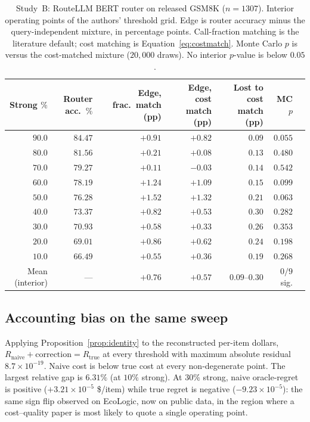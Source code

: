 \documentclass[a4paper,twoside]{article}
\begin{document}
\begin{table}[t]
\centering
\caption{Study~B: RouteLLM BERT router on released GSM8K ($n=1307$). Interior operating points of the authors' threshold grid. Edge is router accuracy minus the query-independent mixture, in percentage points. Call-fraction matching is the literature default; cost matching is Equation~\eqref{eq:costmatch}. Monte Carlo $p$ is versus the cost-matched mixture ($20{,}000$ draws). No interior $p$-value is below $0.05$.}
\label{tab:routellm}
\scriptsize
\begin{tabular}{@{}r r r r r r r@{}}
\toprule
Strong $\%$ & Router acc.\ $\%$ & Edge, frac.\ match (pp) & Edge, cost match (pp) & Lost to cost match (pp) & MC $p$ \\
\midrule
$90.0$ & $84.47$ & $+0.91$ & $+0.82$ & $0.09$ & $0.055$ \\
$80.0$ & $81.56$ & $+0.21$ & $+0.08$ & $0.13$ & $0.480$ \\
$70.0$ & $79.27$ & $+0.11$ & $-0.03$ & $0.14$ & $0.542$ \\
$60.0$ & $78.19$ & $+1.24$ & $+1.09$ & $0.15$ & $0.099$ \\
$50.0$ & $76.28$ & $+1.52$ & $+1.32$ & $0.21$ & $0.063$ \\
$40.0$ & $73.37$ & $+0.82$ & $+0.53$ & $0.30$ & $0.282$ \\
$30.0$ & $70.93$ & $+0.58$ & $+0.33$ & $0.26$ & $0.353$ \\
$20.0$ & $69.01$ & $+0.86$ & $+0.62$ & $0.24$ & $0.198$ \\
$10.0$ & $66.49$ & $+0.55$ & $+0.36$ & $0.19$ & $0.268$ \\
\midrule
Mean (interior) & --- & $+0.76$ & $+0.57$ & $0.09$--$0.30$ & $0/9$ sig. \\
\bottomrule
\end{tabular}
\end{table}

\subsection{Accounting bias on the same sweep}

Applying Proposition~\ref{prop:identity} to the reconstructed per-item dollars, $R_{\mathrm{naive}}+{\mathrm{correction}}=R_{\mathrm{true}}$ at every threshold with maximum absolute residual $8.7\times 10^{-19}$. Naive cost is below true cost at every non-degenerate point. The largest relative gap is $6.31\%$ (at $10\%$ strong). At $30\%$ strong, naive oracle-regret is positive ($+3.21\times 10^{-5}$ \$/item) while true regret is negative ($-9.23\times 10^{-5}$): the same sign flip observed on EcoLogic, now on public data, in the region where a cost--quality paper is most likely to quote a single operating point.
\end{document}
